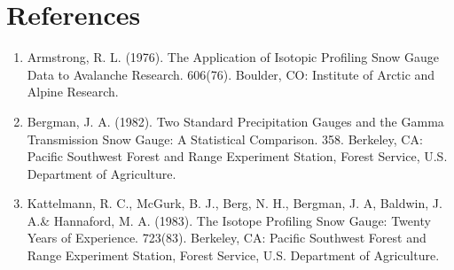 \documentclass[11pt]{article} %
\begin{document}
\section*{References}
\begin{enumerate}[1.]
\item Armstrong, R. L. (1976). The Application of Isotopic Profiling Snow Gauge Data to Avalanche Research. 606(76). Boulder, CO: Institute of Arctic and Alpine Research.
\item Bergman, J.  A. (1982). Two Standard Precipitation Gauges and the Gamma Transmission Snow Gauge: A Statistical Comparison. 358. Berkeley, CA: Pacific Southwest Forest and Range Experiment Station, Forest Service, U.S. Department of Agriculture.
\item Kattelmann, R. C., McGurk, B. J., Berg, N. H., Bergman, J. A, Baldwin, J.  A.\& Hannaford, M. A. (1983). The Isotope Profiling Snow Gauge: Twenty Years of Experience. 723(83). Berkeley, CA: Pacific Southwest Forest and Range Experiment Station, Forest Service, U.S. Department of Agriculture.
\end{enumerate}
\end{document}
